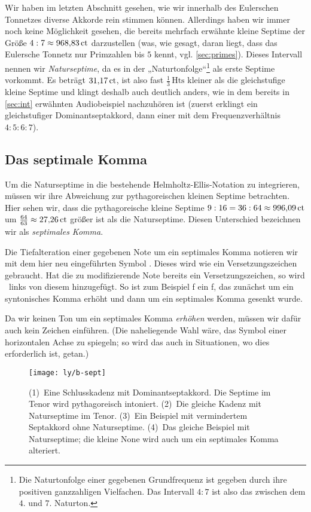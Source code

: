 Wir haben im letzten Abschnitt gesehen, wie wir innerhalb des Eulerschen
Tonnetzes diverse Akkorde rein stimmen können.  Allerdings haben wir immer noch
keine Möglichkeit gesehen, die bereits mehrfach erwähnte kleine Septime der
Größe $4:7\approx 968{,}83\,\mathrm{ct}$ darzustellen (was, wie gesagt, daran liegt,
dass das Eulersche Tonnetz nur Primzahlen bis $5$ kennt,
vgl. \cref{sec:primes}). Dieses Intervall nennen wir \emph{Naturseptime}, da es
in der „Naturtonfolge“\footnote{Die Naturtonfolge einer gegebenen Grundfrequenz
  ist gegeben durch ihre positiven ganzzahligen Vielfachen. Das Intervall $4:7$
  ist also das zwischen dem $4$. und $7$. Naturton.} als erste Septime vorkommt.
Es beträgt $31{,}17\,\mathrm{ct}$, ist also fast $\frac13\,\text{Hts}$ kleiner als
die gleichstufige kleine Septime und klingt deshalb auch deutlich anders, wie in
dem bereits in \cref{sec:int} erwähnten Audiobeispiel nachzuhören ist
(zuerst erklingt ein gleichstufiger Dominantseptakkord, dann einer mit dem
Frequenzverhältnis $4:5:6:7$).

\subsection{Das septimale Komma}

Um die Naturseptime in die bestehende Helmholtz-Ellis-Notation zu integrieren,
müssen wir ihre Abweichung zur pythagoreischen kleinen Septime betrachten.  Hier
sehen wir, dass die pythagoreische kleine Septime
$9:16=36:64\approx 996{,}09\,\mathrm{ct}$ um $\frac{64}{63}\approx 27{,}26\,\mathrm{ct}$
größer ist als die Naturseptime. Diesen Unterschied bezeichnen wir als
\emph{septimales Komma}.

Die Tiefalteration einer gegebenen Note um ein septimales Komma notieren wir mit
dem hier neu eingeführten Symbol \septimal.  Dieses wird wie ein
Versetzungszeichen gebraucht. Hat die zu modifizierende Note bereits ein
Versetzungszeichen, so wird \septimal\ links von diesem hinzugefügt. So ist zum
Beispiel \septimal\naturalp f ein f, das zunächst um ein syntonisches Komma
erhöht und dann um ein septimales Komma gesenkt wurde.

Da wir keinen Ton um ein septimales Komma \emph{erhöhen} werden, müssen wir
dafür auch kein Zeichen einführen. (Die naheliegende Wahl wäre, das Symbol einer
horizontalen Achse zu spiegeln; so wird das auch in Situationen, wo dies
erforderlich ist, getan.)

\begin{figure}
	\centering
	\texttt{[image: ly/b-sept]}
	\caption{(1)~Eine Schlusskadenz mit Dominantseptakkord. Die Septime im
		Tenor wird pythagoreisch intoniert.
		\quad(2)~Die gleiche Kadenz mit Naturseptime im Tenor.
		\quad(3)~Ein Beispiel mit vermindertem Septakkord ohne Naturseptime.
		\quad(4)~Das gleiche Beispiel mit Naturseptime; die kleine None wird
		auch um ein septimales Komma alteriert.}\label{fig:sept}
\end{figure}

